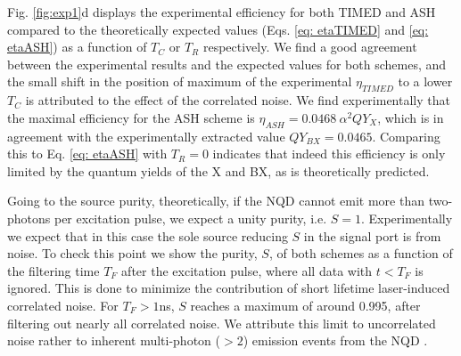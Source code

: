 \documentclass[journal=nalefd,manuscript=letter]{achemso}
\begin{document}
Fig. \ref{fig:exp1}d displays the experimental efficiency for both TIMED and ASH compared to the theoretically expected values (Eqs. \ref{eq: etaTIMED} and \ref{eq: etaASH}) as a function of $T_C$ or $T_R$ respectively. 
We find a good agreement between the experimental results and the expected values for both schemes,
and the small shift in the position of maximum of the experimental $\eta_{TIMED}$ to a lower $T_C$ is attributed to the effect of the correlated noise. 
We find experimentally that the maximal efficiency for the ASH scheme is $\eta_{ASH}=0.0468 \ \alpha^2 QY_X$, which is in agreement with the experimentally extracted value $QY_{BX} = 0.0465$. Comparing this to Eq. \ref{eq: etaASH} with $T_R=0$ indicates that indeed this efficiency is only limited by the quantum yields of the X and BX, as is theoretically predicted. 

Going to the source purity, theoretically, if the NQD cannot emit more than two-photons per excitation pulse, we expect a unity purity, i.e. $S=1$. Experimentally we expect that in this case the sole source reducing $S$ in the signal port is from noise. 
To check this point we show the purity, $S$, of both schemes as a function of the filtering time $T_F$ after the excitation pulse, 
where all data with $t<T_F$ is ignored. This is done to minimize the contribution of short lifetime laser-induced correlated noise.
For $T_F>1$ns, $S$ reaches a maximum of around 0.995, after filtering out nearly all correlated noise.
We attribute this limit to uncorrelated noise rather to inherent multi-photon ($>2$) emission events from the NQD \cite{supp}.

\end{document}
